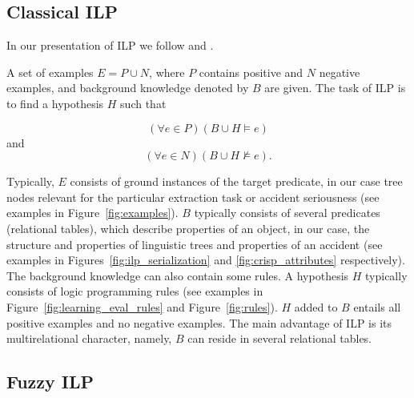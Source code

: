 
\subsection{Classical ILP} \label{sec:third_ILP_classic}

In our presentation of ILP we follow \cite{dzeroski2001:relat_dm} and  \cite{biblio:Muggleton94inductivelogic}.


\begin{definition}
A set of examples $E=P\cup N$, where $P$ contains positive and $N$ negative examples, and background knowledge denoted by $B$ are given. The task of ILP is to find a hypothesis $H$ such that 

$$
(\forall e\in P)(B\cup H\models e)
$$
and
$$
(\forall e\in N)(B\cup H\not\models e).
$$
\end{definition}
Typically, $E$ consists of ground instances of the target predicate, in our case tree nodes relevant for the particular extraction task or accident seriousness (see examples in Figure~\ref{fig:examples}). $B$ typically consists of several predicates (relational tables), which describe properties of an object, in our case, the structure and properties of linguistic trees and properties of an accident (see examples in Figures~\ref{fig:ilp_serialization} and \ref{fig:crisp_attributes} respectively). The background knowledge can also contain some rules. A hypothesis $H$ typically consists of logic programming rules (see examples in Figure~\ref{fig:learning_eval_rules} and Figure~\ref{fig:rules}). $H$ added to $B$ entails all positive examples and no negative examples.
%
The main advantage of ILP is its multirelational character, namely, $B$ can reside in several relational tables.





\subsection{Fuzzy ILP}

